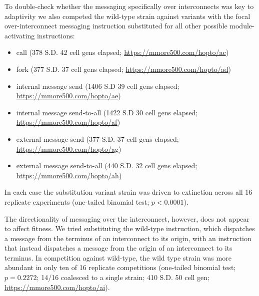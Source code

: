To double-check whether the messaging specifically over interconnects was key to adaptivity we also competed the wild-type strain against variants with the focal over-interconnect messaging instruction substituted for all other possible module-activating instructions:
\begin{itemize}
  \item call (378 S.D. 42 cell gens elapsed; \url{https://mmore500.com/hopto/ac})
  \item fork (377 S.D. 37 cell gens elapsed; \url{https://mmore500.com/hopto/ad})
  \item internal message send (1406 S.D 39 cell gens elapsed; \url{https://mmore500.com/hopto/ae})
  \item internal message send-to-all (1422 S.D 30 cell gens elapsed; \url{https://mmore500.com/hopto/af})
  \item external message send (377 S.D. 37 cell gens elapsed; \url{https://mmore500.com/hopto/ag})
  \item external message send-to-all (440 S.D. 32 cell gens elapsed; \url{https://mmore500.com/hopto/ah})
\end{itemize}
In each case the substitution variant strain was driven to extinction across all 16 replicate experiments (one-tailed binomial test; $p < 0.0001$).

The directionality of messaging over the interconnect, however, does not appear to affect fitness.
We tried substituting the wild-type instruction, which dispatches a message from the terminus of an interconnect to its origin, with an instruction that instead dispatches a message from the origin of an interconnect to its terminus.
In competition against wild-type, the wild type strain was more abundant in only ten of 16 replicate competitions (one-tailed binomial test; $p = 0.2272$; 14/16 coalesced to a single strain; 410 S.D. 50 cell gen; \url{https://mmore500.com/hopto/ai}).

